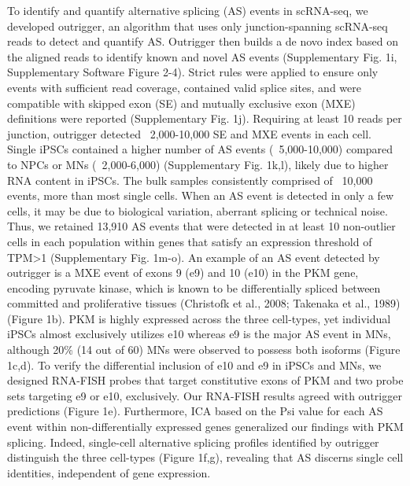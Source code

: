 To identify and quantify alternative splicing (AS) events in scRNA-seq, we developed outrigger, an algorithm that uses only junction-spanning scRNA-seq reads to detect and quantify AS. Outrigger then builds a de novo index based on the aligned reads to identify known and novel AS events (Supplementary Fig. 1i, Supplementary Software Figure 2-4). Strict rules were applied to ensure only events with sufficient read coverage, contained valid splice sites, and were compatible with skipped exon (SE) and mutually exclusive exon (MXE) definitions were reported (Supplementary Fig. 1j). Requiring at least 10 reads per junction, outrigger detected ~2,000-10,000 SE and MXE events in each cell. Single iPSCs contained a higher number of AS events (~5,000-10,000) compared to NPCs or MNs (~2,000-6,000) (Supplementary Fig. 1k,l), likely due to higher RNA content in iPSCs. The bulk samples consistently comprised of ~10,000 events, more than most single cells. When an AS event is detected in only a few cells, it may be due to biological variation, aberrant splicing or technical noise. Thus, we retained 13,910 AS events that were detected in at least 10 non-outlier cells in each population within genes that satisfy an expression threshold of TPM>1 (Supplementary Fig. 1m-o). An example of an AS event detected by outrigger is a MXE event of exons 9 (e9) and 10 (e10) in the PKM gene, encoding pyruvate kinase, which is known to be differentially spliced between committed and proliferative tissues (Christofk et al., 2008; Takenaka et al., 1989) (Figure 1b). PKM is highly expressed across the three cell-types, yet individual iPSCs almost exclusively utilizes e10 whereas e9 is the major AS event in MNs, although 20\% (14 out of 60) MNs were observed to possess both isoforms (Figure 1c,d). To verify the differential inclusion of e10 and e9 in iPSCs and MNs, we designed RNA-FISH probes that target constitutive exons of PKM and two probe sets targeting e9 or e10, exclusively. Our RNA-FISH results agreed with outrigger predictions (Figure 1e). Furthermore, ICA based on the Psi value for each AS event within non-differentially expressed genes generalized our findings with PKM splicing. Indeed, single-cell alternative splicing profiles identified by outrigger distinguish the three cell-types (Figure 1f,g), revealing that AS discerns single cell identities, independent of gene expression.

